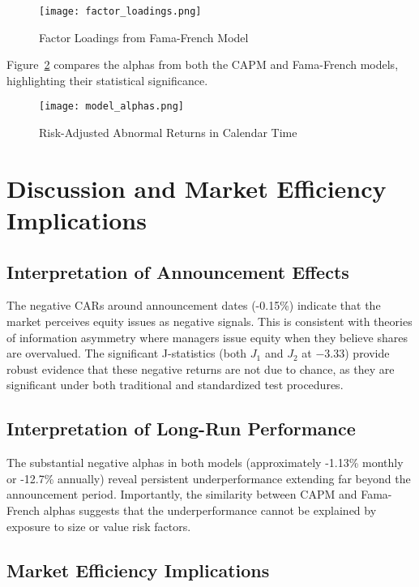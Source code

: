 \documentclass[12pt]{article}
\begin{document}
\begin{figure}[H]
\centering
\texttt{[image: factor\_loadings.png]}
\caption{Factor Loadings from Fama-French Model}
\label{fig:factor_loadings}
\end{figure}

Figure~\ref{fig:alphas} compares the alphas from both the CAPM and Fama-French models, highlighting their statistical significance.

\begin{figure}[H]
\centering
\texttt{[image: model\_alphas.png]}
\caption{Risk-Adjusted Abnormal Returns in Calendar Time}
\label{fig:alphas}
\end{figure}

\section{Discussion and Market Efficiency Implications}

\subsection{Interpretation of Announcement Effects}

The negative CARs around announcement dates (-0.15\%) indicate that the market perceives equity issues as negative signals. This is consistent with theories of information asymmetry where managers issue equity when they believe shares are overvalued. The significant J-statistics (both $J_1$ and $J_2$ at $-3.33$) provide robust evidence that these negative returns are not due to chance, as they are significant under both traditional and standardized test procedures.

\subsection{Interpretation of Long-Run Performance}

The substantial negative alphas in both models (approximately -1.13\% monthly or -12.7\% annually) reveal persistent underperformance extending far beyond the announcement period. Importantly, the similarity between CAPM and Fama-French alphas suggests that the underperformance cannot be explained by exposure to size or value risk factors.


\subsection{Market Efficiency Implications}
\end{document}
